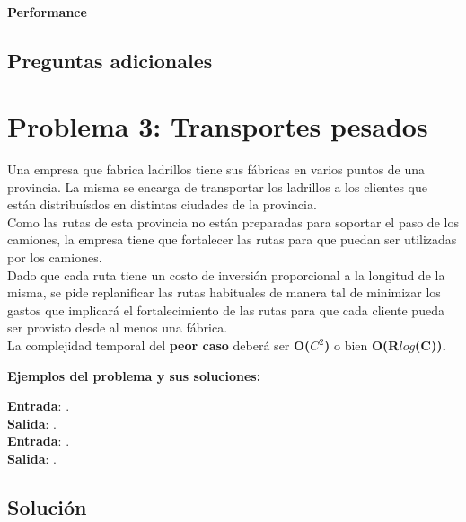 \documentclass[a4paper, 10pt, twoside]{article}
\begin{document}
\paragraph{Performance}

\subsection{Preguntas adicionales}





\newpage

\section{Problema 3: Transportes pesados}

Una empresa que fabrica ladrillos tiene sus fábricas en varios puntos de una provincia. La misma se encarga de transportar los ladrillos a los clientes que están distribuísdos en distintas ciudades de la provincia.\\
Como las rutas de esta provincia no están preparadas para soportar el paso de los camiones, la empresa tiene que fortalecer las rutas para que puedan ser utilizadas por los camiones.\\
Dado que cada ruta tiene un costo de inversión proporcional a la longitud de la misma, se pide replanificar las rutas habituales de manera tal de minimizar los gastos que implicará el fortalecimiento de las rutas para que cada cliente pueda ser provisto desde al menos una fábrica.\\
La complejidad temporal del \textbf{peor caso} deberá ser \textbf{O($C^2$)} o bien \textbf{O(R$log$(C)).}

\textbf{Ejemplos del problema y sus soluciones:}

\textbf{Entrada}: . \\
\textbf{Salida}: . \\

\textbf{Entrada}: . \\
\textbf{Salida}: . \\

\subsection{Solución}
\end{document}
